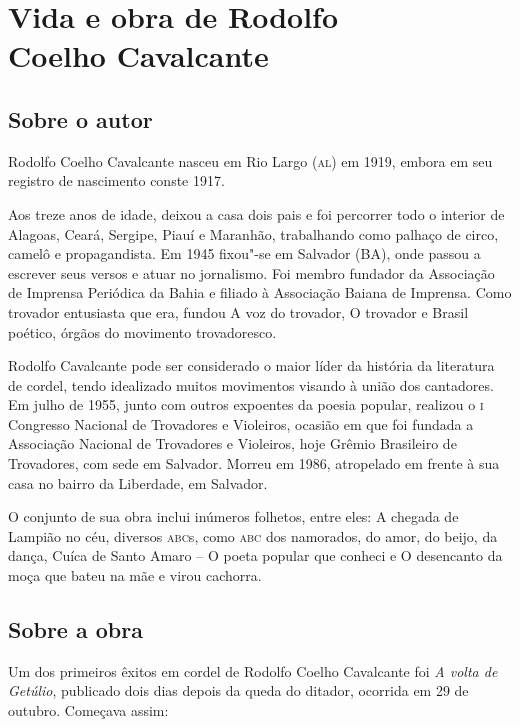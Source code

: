 \chapter[Vida e obra de Rodolfo Coelho Cavalcante]{Vida e obra de Rodolfo\\ Coelho Cavalcante}

\section{Sobre o autor}

\noindent{}Rodolfo Coelho Cavalcante nasceu em Rio Largo (\textsc{al}) em 1919, embora em
seu registro de nascimento conste 1917. 

Aos treze anos de idade, deixou a casa dois pais e foi percorrer todo o
interior de Alagoas, Ceará, Sergipe, Piauí e Maranhão, trabalhando como
palhaço de circo, camelô e propagandista. Em 1945 fixou"-se em Salvador
(BA), onde passou a escrever seus versos e atuar no jornalismo. Foi
membro fundador da Associação de Imprensa Periódica da Bahia e filiado
à Associação Baiana de Imprensa. Como trovador entusiasta que era,
fundou A voz do trovador, O trovador e Brasil poético, órgãos do
movimento trovadoresco.

Rodolfo Cavalcante pode ser considerado o maior líder da história da
literatura de cordel, tendo idealizado muitos movimentos visando à
união dos cantadores. Em julho de 1955, junto com outros expoentes da
poesia popular, realizou o \textsc{i} Congresso Nacional de Trovadores e
Violeiros, ocasião em que foi fundada a Associação Nacional de
Trovadores e Violeiros, hoje Grêmio Brasileiro de Trovadores, com sede
em Salvador. Morreu em 1986, atropelado em frente à sua casa no bairro
da Liberdade, em Salvador.

O conjunto de sua obra inclui inúmeros folhetos, entre eles: A chegada
de Lampião no céu, diversos \textsc{abc}s, como \textsc{abc} dos namorados, do amor, do
beijo, da dança, Cuíca de Santo Amaro – O poeta popular que conheci e O
desencanto da moça que bateu na mãe e virou cachorra.

\section{Sobre a obra}

Um dos primeiros êxitos em cordel de Rodolfo Coelho Cavalcante foi \textit{A volta de Getúlio}, publicado dois dias depois da queda do ditador, ocorrida em 29 de
outubro. Começava assim: 


